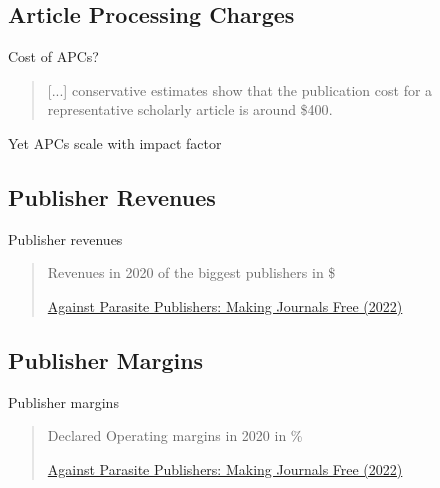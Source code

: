 \documentclass[10pt,compress,serif,aspectratio=169]{beamer}
\newcommand{\fig}[2]{\centering{\texttt{[image: \#2]}}}
\begin{document}
\subsection{Article Processing Charges}
\begin{frame}[t]{Cost of APCs?}

  \begin{quote}
   [...] conservative estimates show that the publication cost for a representative scholarly article \alert{is around \$400}.
 \end{quote}
 \pause

 \begin{center}
 \alert{\Large Yet APCs scale with impact factor}\\
 \end{center}

 \pause
 \fig{.6}{publisher-APC}

\end{frame}


\subsection{Publisher Revenues}
\begin{frame}[t]{Publisher revenues}
 \fig{.5}{publishers-revenues}
 \begin{quote}
   Revenues in 2020 of the biggest publishers in \$

   \href{https://doi.org/10.5281/zenodo.7212922}{Against Parasite Publishers: Making Journals Free (2022)}

 \end{quote}
\end{frame}

\subsection{Publisher Margins}
\begin{frame}[t]{Publisher margins}
 \fig{.55}{publisher-margins}
 \begin{quote}

   Declared Operating margins in 2020 in \%

   \href{https://doi.org/10.5281/zenodo.7212922}{Against Parasite Publishers: Making Journals Free (2022)}


\end{quote}
\end{frame}

\end{document}
